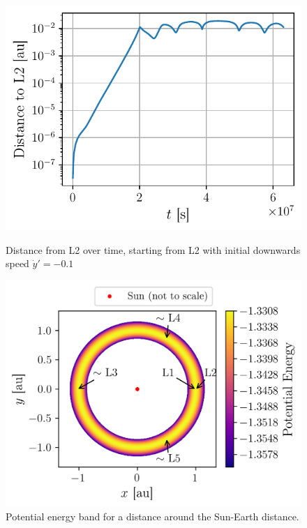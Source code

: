 \begin{figure}[h]
    \centering
    \begin{minipage}{.45\textwidth}
        \centering
        \includegraphics[width=\linewidth]{figures/lagrange_exponential_distance.pdf}
        \caption{Distance from L2 over time, starting from L2 with initial downwards speed \(\dot y' = -0.1\)}
        \label{fig:lagrange_distance_L2}
    \end{minipage}
    \hspace{0.1cm}
    \begin{minipage}{.52\textwidth}
        \centering
        \includegraphics[width=\linewidth]{figures/potential_global.png}
        \caption{Potential energy band for a distance around the Sun-Earth distance.}
        \label{fig:lagrange_potential_global}
    \end{minipage}
\end{figure}

